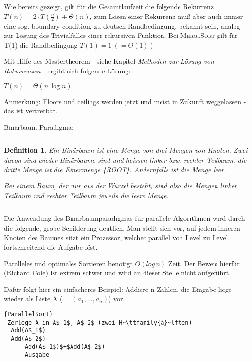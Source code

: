 \documentclass[ngerman]{scrreprt}%
\theoremstyle{break}
\newtheorem{definition}{Definition}
\begin{document}
Wie bereits gezeigt, gilt für die Gesamtlaufzeit die folgende Rekurrenz $T(n) = 2\cdot T(\frac{n}{2})+\Theta(n)$, zum Lösen einer
Rekurrenz muß aber auch immer eine sog. boundary condition, zu deutsch Randbedingung, bekannt sein, analog zur Lösung des Trivialfalles einer rekursiven
Funktion. Bei \textsc{MergeSort} gilt für T(1) die Randbedingung $T(1) = 1\ (=\Theta(1))$

Mit Hilfe des Mastertheorem - siehe Kapitel \textit{Methoden zur Lösung von Rekurrenzen} - ergibt sich folgende Lösung:

$T(n) = \Theta(n\,\log n)$ 

Anmerkung: Floors und ceilings werden jetzt und meist in Zukunft weggelassen - das ist vertretbar.

\begin{description}
	\item [Binärbaum-Paradigma:] 
\end{description}
	
$$  $$

\begin{definition}
	  Ein Binärbaum ist eine Menge von drei Mengen von Knoten. Zwei davon sind wieder Binärbaume sind und heissen linker bzw.
	  rechter Teilbaum, die dritte Menge ist die Einermenge \{ROOT\}. Andernfalls ist die Menge leer.
	  
	  Bei einem Baum, der nur aus der Wurzel besteht, sind also die Mengen linker Teilbaum und rechter Teilbaum jeweils die leere
	  Menge.
\end{definition}

$$  $$

Die Anwendung des Binärbaumparadigmas für parallele Algorithmen wird durch die folgende, grobe Schilderung deutlich.
Man stellt sich vor, auf jedem inneren Knoten des Baumes sitzt ein Prozessor, welcher parallel von Level zu Level fortschreitend die
Aufgabe löst.

Paralleles und optimales Sortieren benötigt $O(log\,n)$ Zeit. Der Beweis hierfür (Richard Cole) ist extrem schwer und wird an dieser Stelle nicht aufgeführt.

Dafür folgt hier ein einfacheres Beispiel: Addiere n Zahlen, die Eingabe liege wieder als Liste A ($=(a_1,\ldots,a_n)$) vor.

\begin{Algorithmus}[h]
\begin{lstlisting}[frame=tlrb, mathescape=true, title=\textsc{ParallelSort}, gobble=1]{ParallelSort}
 Zerlege A in A$_1$, A$_2$ (zwei H~\ttfamily{ä}~lften)
  Add(A$_1$)
  Add(A$_2$)
      Add(A$_1$)$+$Add(A$_2$)
      Ausgabe
      \end{lstlisting}
  \end{Algorithmus}
\end{document}
